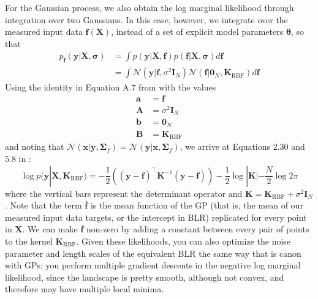 \documentclass{article}
\begin{document}
For the Gaussian process, we also obtain the log marginal likelihood through integration over two Gaussians. In this case, however, we integrate over the measured input data $\mathbf{f}(\mathbf{X})$, instead of a set of explicit model parameters $\boldsymbol{\theta}$, so that
\begin{equation}
\begin{split}
    p_{\mathbf{f}}(\mathbf{y}|\mathbf{X},\boldsymbol{\sigma})&=\int p(\mathbf{y}|\mathbf{X},\mathbf{f})p(\mathbf{f}|\mathbf{X},\boldsymbol{\sigma})d\mathbf{f} \\
    &= \int \mathcal{N}(\mathbf{y}|\mathbf{f},\sigma^2\mathbf{I}_N)\mathcal{N}(\mathbf{f}|\mathbf{0}_{N},\mathbf{K}_\text{RBF})d\mathbf{f}
    \end{split}
\end{equation}Using the identity in Equation A.7 from \cite{rasmussen} with the values
\begin{equation}
\begin{split}
    \mathbf{a} &= \mathbf{f} \\
    \mathbf{A} &= \sigma^2\mathbf{I}_N \\
    \mathbf{b} &= \mathbf{0}_N \\
    \mathbf{B} &= \mathbf{K}_\text{RBF}
\end{split}
\end{equation}and noting that $\mathcal{N}(\mathbf{x}|\mathbf{y},\boldsymbol{\Sigma}_f)=\mathcal{N}(\mathbf{y}|\mathbf{x},\boldsymbol{\Sigma}_f)$, we arrive at Equations 2.30 and 5.8 in \cite{rasmussen}:
\begin{equation}
    \log p(\mathbf{y}|\mathbf{X},\mathbf{K}_\text{RBF}) = -\frac{1}{2}\left((\mathbf{y}-\overline{\mathbf{f}})^\top \mathbf{K}^{-1} (\mathbf{y}-\overline{\mathbf{f}}) \right) - \frac{1}{2}\log|\mathbf{K}| - \frac{N}{2}\log 2\pi
\end{equation}where the vertical bars represent the determinant operator and $\mathbf{K}=\mathbf{K}_\text{RBF}+\sigma^2 \mathbf{I}_N$. Note that the term $\overline{\mathbf{f}}$ is the mean function of the GP (that is, the mean of our measured input data targets, or the intercept in BLR) replicated for every point in $\mathbf{X}$. We can make $\overline{\mathbf{f}}$ non-zero by adding a constant between every pair of points to the kernel $\mathbf{K}_\text{RBF}$. Given these likelihoods, you can also optimize the noise parameter and length scales of the equivalent BLR the same way that is canon with GPs: you perform multiple gradient descents in the negative log marginal likelihood, since the landscape is pretty smooth, although not convex, and therefore may have multiple local minima. 
\end{document}
